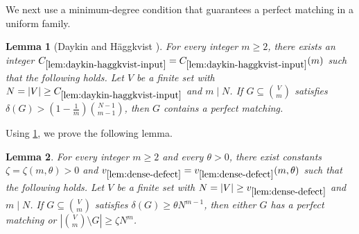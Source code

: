 \documentclass[10pt,a4paper]{article}
\numberwithin{equation}{section}
\newtheorem{lemma}[lemma]{Lemma}
\theoremstyle{definition}
\begin{document}
We next use a minimum-degree condition that guarantees a perfect matching in a uniform family.

\begin{lemma}[Daykin and H\"aggkvist \cite{DaykinHaggkvist}]
        \label{lem:daykin-haggkvist-input}
        For every integer $m\ge2$, there exists an integer
        $C_{\ref{lem:daykin-haggkvist-input}}
                =C_{\ref{lem:daykin-haggkvist-input}}(m)$ such that the
        following holds.  Let $V$ be a finite set with
        $N=|V|\ge C_{\ref{lem:daykin-haggkvist-input}}$ and $m\mid N$.
        If $G\subseteq\binom Vm$ satisfies $\delta(G)>\left(1-\frac1m\right)\binom{N-1}{m-1}$, then $G$ contains a perfect matching.
\end{lemma}

Using \cref{lem:daykin-haggkvist-input}, we prove the following lemma.

\begin{lemma}\label{lem:dense-defect}
        For every integer $m\ge2$ and every $\theta>0$, there exist
        constants $\zeta=\zeta(m,\theta)>0$ and
        $v_{\ref{lem:dense-defect}}=v_{\ref{lem:dense-defect}}(m,\theta)$
        such that the following holds.  Let $V$ be a finite set with
        $N=|V|\ge v_{\ref{lem:dense-defect}}$ and $m\mid N$.
        If $G\subseteq\binom Vm$ satisfies $\delta(G)\ge \theta N^{m-1}$, then either $G$ has a perfect matching or $\left|\binom Vm\setminus G\right|\ge \zeta N^m$.
\end{lemma}
\end{document}
